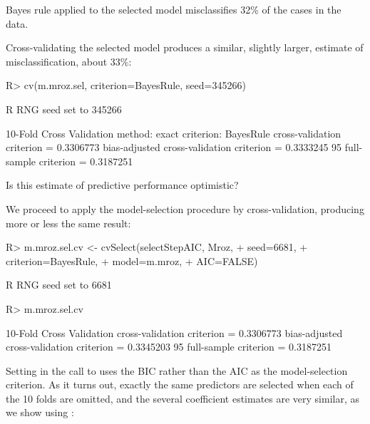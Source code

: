 \documentclass[
]{jss}
\begin{document}
Bayes rule applied to the selected model misclassifies 32\% of the cases
in the  data.

Cross-validating the selected model produces a similar, slightly larger,
estimate of misclassification, about 33\%:

\begin{CodeChunk}
\begin{CodeInput}
R> cv(m.mroz.sel, criterion=BayesRule, seed=345266)
\end{CodeInput}
\begin{CodeOutput}
R RNG seed set to 345266
\end{CodeOutput}
\begin{CodeOutput}
10-Fold Cross Validation
method: exact
criterion: BayesRule
cross-validation criterion = 0.3306773
bias-adjusted cross-validation criterion = 0.3333245
95%
full-sample criterion = 0.3187251 
\end{CodeOutput}
\end{CodeChunk}

Is this estimate of predictive performance optimistic?

We proceed to apply the model-selection procedure by cross-validation,
producing more or less the same result:

\begin{CodeChunk}
\begin{CodeInput}
R> m.mroz.sel.cv <- cvSelect(selectStepAIC, Mroz, 
+                           seed=6681,
+                           criterion=BayesRule,
+                           model=m.mroz,
+                           AIC=FALSE)
\end{CodeInput}
\begin{CodeOutput}
R RNG seed set to 6681
\end{CodeOutput}
\begin{CodeInput}
R> m.mroz.sel.cv
\end{CodeInput}
\begin{CodeOutput}
10-Fold Cross Validation
cross-validation criterion = 0.3306773
bias-adjusted cross-validation criterion = 0.3345203
95%
full-sample criterion = 0.3187251 
\end{CodeOutput}
\end{CodeChunk}

Setting  in the call to  uses the BIC
rather than the AIC as the model-selection criterion. As it turns out,
exactly the same predictors are selected when each of the 10 folds are
omitted, and the several coefficient estimates are very similar, as we
show using :
\end{document}
